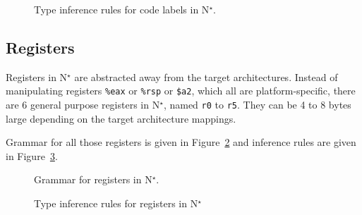 \begin{figure}[H]
  \centering

  \begin{prooftree}
  \end{prooftree}

  \caption{Type inference rules for code labels in N$^\star$.}
  \label{fig:nstar-common-expressions-labels-code-typerules}
\end{figure}

\subsection{Registers}\label{subsec:nstar-common-expressions-registers}

Registers in N$^\star$ are abstracted away from the target architectures.
Instead of manipulating registers \texttt{\%eax} or \texttt{\%rsp} or \texttt{\$a2}, which all are platform-specific, there are 6 general purpose registers in N$^\star$, named \texttt{r0} to \texttt{r5}.
They can be 4 to 8 bytes large depending on the target architecture mappings.

Grammar for all those registers is given in Figure~\ref{fig:nstar-common-expressions-registers-grammar} and inference rules are given in Figure~\ref{fig:nstar-common-expressions-registers-typerules}.

\begin{figure}[htb]
  \centering


  \caption{Grammar for registers in N$^\star$.}
  \label{fig:nstar-common-expressions-registers-grammar}
\end{figure}

\begin{figure}[htb]
  \centering

  \begin{prooftree}
  \end{prooftree}

  \caption{Type inference rules for registers in N$^\star$}
  \label{fig:nstar-common-expressions-registers-typerules}
\end{figure}

